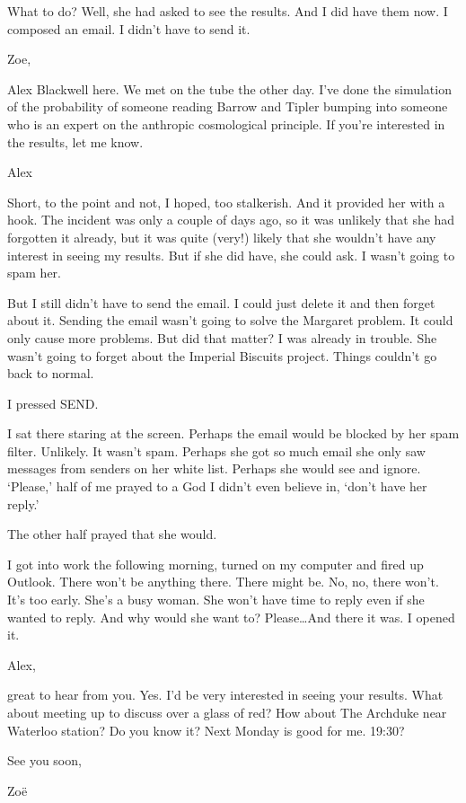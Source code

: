 What to do? Well, she had asked to see the results. And I did have
them now. I composed an email. I didn't have to send it.

\startmessage
Zoe,

Alex Blackwell here. We met on the tube the other day. I've done the
simulation of the probability of someone reading Barrow and Tipler
bumping into someone who is an expert on the anthropic cosmological
principle. If you're interested in the results, let me know.

Alex
\stopmessage

Short, to the point and not, I hoped, too stalkerish. And it
provided her with a hook. The incident was only a couple of days
ago, so it was unlikely that she had forgotten it already, but it
was quite (very!) likely that she wouldn't have any interest in
seeing my results. But if she did have, she could ask. I wasn't
going to spam her.

But I still didn't have to send the email. I could just delete it and then
forget about it. Sending the email wasn't going to solve the
Margaret problem. It could only cause more problems. But did that
matter? I was already in trouble. She wasn't going to forget about the Imperial Biscuits project. Things couldn't go back to normal.

I pressed {\twelvett SEND}.

I sat there staring at the screen. Perhaps the email would be
blocked by her spam filter. Unlikely. It wasn't spam. Perhaps she
got so much email she only saw messages from senders on her white
list. Perhaps she would see and ignore. `Please,' half of me prayed
to a God I didn't even believe in, `don't have her reply.'

The other half prayed that she would.

I got into work the following morning, turned on my computer and
fired up Outlook. There won't be anything there. There might be. No,
no, there won't. It's too early. She's a busy woman. She won't have
time to reply even if she wanted to reply. And why would she want
to? Please\dots And there it was. I opened it.

\startmessage
Alex,

great to hear from you. Yes. I'd be very interested in seeing your
results. What about meeting up to discuss over a glass of red? How
about The Archduke near Waterloo station? Do you know it? Next
Monday is good for me. 19:30?

See you soon,

Zoë
\stopmessage

